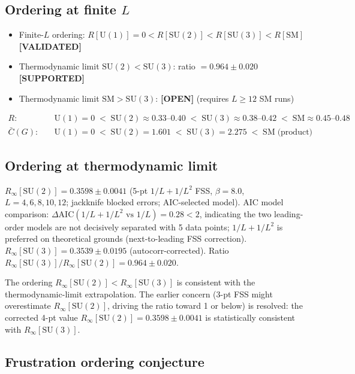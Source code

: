 \documentclass[12pt,a4paper]{article}
\theoremstyle{plain}
\theoremstyle{definition}
\theoremstyle{remark}
\newcommand{\RinfSUtwo}{0.3598 \pm 0.0041}          %
\newcommand{\RinfSUthree}{0.3539 \pm 0.0195}      %
\newcommand{\RinfRatio}{0.964 \pm 0.020}                      %
\begin{document}
\subsection{Ordering at finite $L$}
\begin{itemize}[nosep]
  \item Finite-$L$ ordering: $R[\mathrm{U}(1)]=0 < R[\mathrm{SU}(2)] < R[\mathrm{SU}(3)] < R[\mathrm{SM}]$ \textbf{[VALIDATED]}
  \item Thermodynamic limit $\mathrm{SU}(2) < \mathrm{SU}(3)$: ratio $= \RinfRatio$ \textbf{[SUPPORTED]}
  \item Thermodynamic limit $\mathrm{SM} > \mathrm{SU}(3)$: \textbf{[OPEN]} (requires $L\geq 12$ SM runs)
\end{itemize}
\begin{align*}
R\colon\quad      &\mathrm{U}(1)=0 \;<\; \mathrm{SU}(2)\approx 0.33\text{--}0.40
                   \;<\; \mathrm{SU}(3)\approx 0.38\text{--}0.42
                   \;<\; \mathrm{SM}\approx 0.45\text{--}0.48 \\
\bar{C}(G)\colon\quad &\mathrm{U}(1)=0 \;<\; \mathrm{SU}(2)=1.601
                   \;<\; \mathrm{SU}(3)=2.275 \;<\; \mathrm{SM}\;\text{(product)}
\end{align*}

\subsection{Ordering at thermodynamic limit}
\label{sec:ordering-thermo}

$R_\infty[\mathrm{SU}(2)] = \RinfSUtwo$ (5-pt $1/L+1/L^2$ FSS,
$\beta{=}8.0$, $L=4,6,8,10,12$; jackknife blocked errors; AIC-selected model).
AIC model comparison: $\Delta\mathrm{AIC}(1/L{+}1/L^2 \text{ vs } 1/L) = 0.28 < 2$,
indicating the two leading-order models are not decisively separated with 5 data points;
$1/L+1/L^2$ is preferred on theoretical grounds (next-to-leading FSS correction).
$R_\infty[\mathrm{SU}(3)] = \RinfSUthree$ (autocorr-corrected).
Ratio $R_\infty[\mathrm{SU}(3)]/R_\infty[\mathrm{SU}(2)] = \RinfRatio$.

The ordering $R_\infty[\mathrm{SU}(2)] < R_\infty[\mathrm{SU}(3)]$ is consistent with
the thermodynamic-limit extrapolation.
The earlier concern (3-pt FSS might overestimate $R_\infty[\mathrm{SU}(2)]$,
driving the ratio toward 1 or below) is resolved: the corrected 4-pt value
$R_\infty[\mathrm{SU}(2)] = \RinfSUtwo$ is statistically consistent with $R_\infty[\mathrm{SU}(3)]$.

\subsection{Frustration ordering conjecture}
\end{document}
